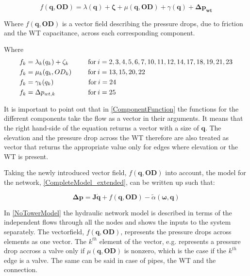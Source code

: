 \begin{equation}
  f(\bm{q}, \bm{OD}) = \lambda(\bm{q}) + \bm{\zeta} + \mu(\bm{q}, \bm{OD}) + \gamma (\bm{q}) + \bm{\Delta p_{wt}}
  \label{ComponentFunction}
\end{equation}

Where $f(\bm{q}, \bm{OD}) $ is a vector field describing the pressure drops, due to friction and the WT capacitance, across each corresponding component. 


Where
\begin{align}
f_k &= \lambda_k (q_k) + \zeta_k  \hskip 1cm  \text{for}\: i = 2,3,4,5,6,7,10,11,12,14,17,18,19,21,23 \\
f_k &= \mu_k (q_k, OD_{k})  \hspace{0.85cm} \text{for}\:i = 13,15,20,22\\
f_k &= \gamma_k (q_k)  \hspace{1.8cm} \text{for}\: i = 24 \\
f_k &= \Delta p_{wt,k}  \hspace{1.7cm} \text{for}\:i = 25
\end{align}

It is important to point out that in \eqref{ComponentFunction} the functions for the different components take the flow as a vector in their arguments. It means that the right hand-side of the equation returns a vector with a size of $\bm{q}$. The elevation and the pressure drop across the WT therefore are also treated as vector that returns the appropriate value only for edges where elevation or the WT is present. 

Taking the newly introduced vector field, $f(\bm{q}, \bm{OD})$ into account, the model for the network, \eqref{CompleteModel_extended}, can be written up such that:

\begin{equation}
  \bm{\Delta p} =  \bm{J} \bm{\dot{q}} + f(\bm{q}, \bm{OD}) - \tilde{\alpha} (\bm{\omega},\bm{q})
  \label{NoTowerModel}
\end{equation}

In \eqref{NoTowerModel} the hydraulic network model is described in terms of the independent flows through all the nodes and shows the inputs to the system separately. The vectorfield, $f(\bm{q}, \bm{OD})$, represents the pressure drops across elements as one vector. The $k^{th}$ element of the vector, e.g. represents a pressure drop accross a valve only if $\mu(\bm{q},\bm{OD})$ is nonzero, which is the case if the $k^{th}$ edge is a valve. The same can be said in case of pipes, the WT and the connection. 

